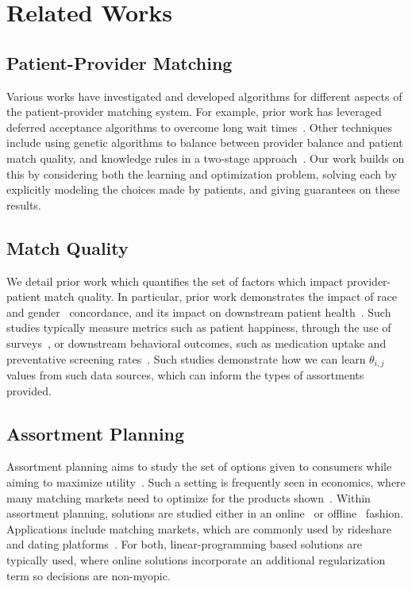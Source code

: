 \section{Related Works}
\subsection{Patient-Provider Matching}
Various works have investigated and developed algorithms for different aspects of the patient-provider matching system. 
For example, prior work has leveraged deferred acceptance algorithms to overcome long wait times~\cite{deferred_acceptance}.  
Other techniques include using genetic algorithms  to balance between provider balance and patient match quality, and knowledge rules in a two-stage approach~\cite{knowledge_rules}. 
Our work builds on this by considering both the learning and optimization problem, solving each by explicitly modeling the choices made by patients, and giving guarantees on these results. 

\subsection{Match Quality}
We detail prior work which quantifies the set of factors which impact provider-patient match quality. 
In particular, prior work demonstrates the impact of race~\cite{race_concordance_lung_cancer,race_medication,race_press_ganey} and gender~\cite{gender_concordance} concordance, and its impact on downstream patient health~\cite{race_medication}. 
Such studies typically measure metrics such as patient happiness, through the use of surveys~\cite{race_press_ganey}, or downstream behavioral outcomes, such as medication uptake \cite{race_medication} and preventative screening rates~\cite{race_diversity_downstream}. 
Such studies demonstrate how we can learn $\theta_{i,j}$ values from such data sources, which can inform the types of assortments provided. 

\subsection{Assortment Planning} 
Assortment planning aims to study the set of options given to consumers while aiming to maximize utility~\cite{assortment_mnl}. 
Such a setting is frequently seen in economics, where many matching markets need to optimize for the products shown~\cite{assortment_mnl}. 
Within assortment planning, solutions are studied either in an online~\cite{online_assortment} or offline~\cite{assortment_mnl} fashion. 
Applications include matching markets, which are commonly used by rideshare and dating platforms~\cite{assortment_matching,platform_dating}.
For both, linear-programming based solutions are typically used, where online solutions incorporate an additional regularization term so decisions are non-myopic. 
